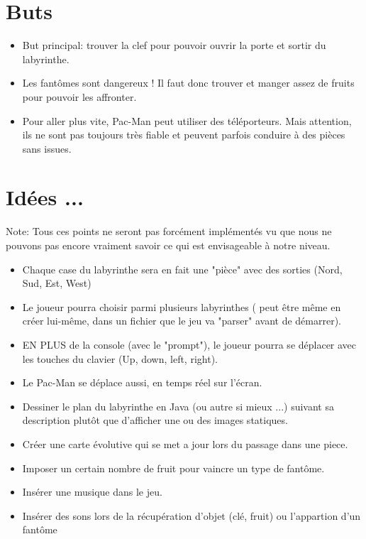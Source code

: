 \documentclass[twoside,french]{report}
\begin{document}
\section{Buts}
   \begin{itemize}
      \item But principal: trouver la clef pour pouvoir ouvrir la porte et sortir du labyrinthe.
      \item Les fantômes sont dangereux ! Il faut donc trouver et manger assez de fruits pour
      pouvoir les affronter.
      \item Pour aller plus vite, Pac-Man peut utiliser des téléporteurs. Mais attention, ils ne 
      sont pas toujours très fiable et peuvent parfois conduire à des pièces sans issues.
   \end{itemize}

\section{Idées ...}
Note: Tous ces points ne seront pas forcément implémentés vu que nous ne pouvons pas encore 
vraiment savoir ce qui est envisageable à notre niveau.
   \begin{itemize}
      \item Chaque case du labyrinthe sera en fait une "pièce" avec des sorties
      (Nord, Sud, Est, West)
      \item Le joueur pourra choisir parmi plusieurs labyrinthes ( peut être même en 
      créer lui-même, dans un fichier que le jeu va "parser" avant de démarrer). %
      \item EN PLUS de la console (avec le "prompt"), le joueur pourra se déplacer avec les 
      touches du clavier (Up, down, left, right).
      \item Le Pac-Man se déplace aussi, en temps réel sur l'écran.
      \item Dessiner le plan du labyrinthe en Java (ou autre si mieux ...) suivant sa description
      plutôt que d'afficher une ou des images statiques.
      \item Créer une carte évolutive qui se met a jour lors du passage dans une piece.
      \item Imposer un certain nombre de fruit pour vaincre un type de fantôme.
      \item Insérer une musique dans le jeu.
      \item Insérer des sons lors de la récupération d'objet (clé, fruit) ou l'appartion d'un fantôme
   \end{itemize}
\end{document}
